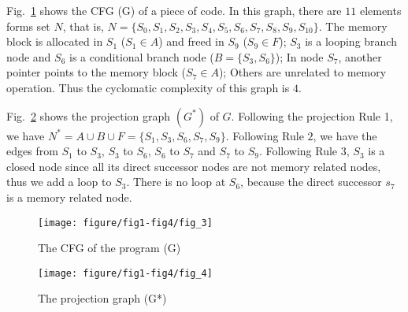 Fig.~\ref{figure3} shows the CFG (G) of a piece of code. In this graph, there are $11$ elements forms set $N$, that is, $N = \{S_0, S_1, S_2, S_3, S_4, S_5, S_6, S_7, S_8, S_9, S_{10}\}$. The memory block is allocated in $S_1$ ($S_1\in A$) and freed in $S_9$ ($S_9\in F$); $S_3$ is a looping branch node and $S_6$ is a conditional branch node ($B=\{S_3, S_6\}$); In node $S_7$, another pointer points to the memory block ($S_7\in A$); Others are unrelated to memory operation. Thus the cyclomatic complexity of this graph is $4$.

Fig.~\ref{fig:4} shows the projection graph $(G^*)$ of $G$. Following the projection Rule 1, we have $N^*=A\cup B\cup F=\{S_1, S_3, S_6, S_7, S_9\}$. Following Rule $2$, we have the edges from $S_1$ to $S_3$, $S_3$ to $S_6$, $S_6$ to $S_7$ and $S_7$ to $S_9$. Following Rule $3$, $S_3$ is a closed node since all its direct successor nodes are not memory related nodes, thus we add a loop to $S_3$. There is no loop at $S_6$, because the direct successor $s_7$ is a memory related node.  

\begin{figure}[!h]
\center
\texttt{[image: figure/fig1-fig4/fig\_3]}
\caption{The CFG of the program (G)}
\label{figure3}
\end{figure}

\begin{figure}[!h]
\center
\texttt{[image: figure/fig1-fig4/fig\_4]}
\caption{The projection graph (G*)}
\label{fig:4}
\end{figure}

